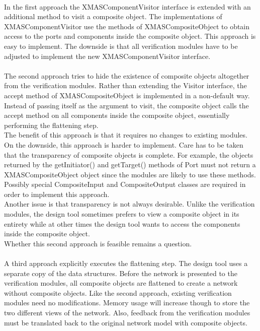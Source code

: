 \documentclass[a4paper,11pt]{article}
\begin{document}
\paragraph{}
In the first approach the XMASComponentVisitor interface is extended with an
additional method to visit a composite object. The implementations of XMASComponentVisitor
use the methods of XMASCompositeObject to obtain access to the ports and components
inside the composite object. This approach is easy to implement. The downside is
that all verification modules have to be adjusted to implement the new XMASComponentVisitor
interface.

\paragraph{}
The second approach tries to hide the existence of composite objects altogether
from the verification modules. Rather than extending the Visitor interface,
the accept method of XMASCompositeObject is implemented in a non-default way.
Instead of passing itself as the argument to visit, the composite object calls
the accept method on all components inside the composite object, essentially
performing the flattening step.\\
The benefit of this approach is that it requires no changes to existing modules.
On the downside, this approach is harder to implement. Care has to be taken
that the transparency of composite objects is complete. For example, the objects
returned by the getInitiator() and getTarget() methods of Port must not return a
XMASCompositeObject object since the modules are likely to use these methods.
Possibly special CompositeInput and CompositeOutput classes are required in
order to implement this approach.\\
Another issue is that transparency is not always desirable.
Unlike the verification modules, the design tool sometimes prefers to
view a composite object in its entirety while at other times the design
tool wants to access the components inside the composite object.\\
Whether this second approach is feasible remains a question.

\paragraph{}
A third approach explicitly executes the flattening step. The design tool
uses a separate copy of the data structures. Before the network is
presented to the verification modules, all composite objects are flattened
to create a network without composite objects. Like the second approach,
existing verification modules need no modifications. Memory usage will
increase though to store the two different views of the network. Also,
feedback from the verification modules must be translated back to the
original network model with composite objects.
\end{document}
